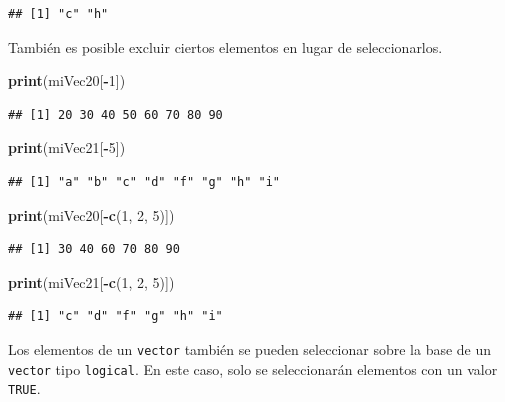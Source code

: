 \documentclass[]{book}
\newenvironment{Shaded}{\begin{snugshade}}{\end{snugshade}}
\newcommand{\KeywordTok}[1]{\textcolor[rgb]{0.13,0.29,0.53}{\textbf{#1}}}
\newcommand{\DecValTok}[1]{\textcolor[rgb]{0.00,0.00,0.81}{#1}}
\newcommand{\OperatorTok}[1]{\textcolor[rgb]{0.81,0.36,0.00}{\textbf{#1}}}
\newcommand{\NormalTok}[1]{#1}
\begin{document}
\begin{verbatim}
## [1] "c" "h"
\end{verbatim}

También es posible excluir ciertos elementos en lugar de seleccionarlos.

\begin{Shaded}
\begin{Highlighting}[]
\KeywordTok{print}\NormalTok{(miVec20[}\OperatorTok{-}\DecValTok{1}\NormalTok{])}
\end{Highlighting}
\end{Shaded}

\begin{verbatim}
## [1] 20 30 40 50 60 70 80 90
\end{verbatim}

\begin{Shaded}
\begin{Highlighting}[]
\KeywordTok{print}\NormalTok{(miVec21[}\OperatorTok{-}\DecValTok{5}\NormalTok{])}
\end{Highlighting}
\end{Shaded}

\begin{verbatim}
## [1] "a" "b" "c" "d" "f" "g" "h" "i"
\end{verbatim}

\begin{Shaded}
\begin{Highlighting}[]
\KeywordTok{print}\NormalTok{(miVec20[}\OperatorTok{-}\KeywordTok{c}\NormalTok{(}\DecValTok{1}\NormalTok{, }\DecValTok{2}\NormalTok{, }\DecValTok{5}\NormalTok{)])}
\end{Highlighting}
\end{Shaded}

\begin{verbatim}
## [1] 30 40 60 70 80 90
\end{verbatim}

\begin{Shaded}
\begin{Highlighting}[]
\KeywordTok{print}\NormalTok{(miVec21[}\OperatorTok{-}\KeywordTok{c}\NormalTok{(}\DecValTok{1}\NormalTok{, }\DecValTok{2}\NormalTok{, }\DecValTok{5}\NormalTok{)])}
\end{Highlighting}
\end{Shaded}

\begin{verbatim}
## [1] "c" "d" "f" "g" "h" "i"
\end{verbatim}

Los elementos de un \texttt{vector} también se pueden seleccionar sobre
la base de un \texttt{vector} tipo \texttt{logical}. En este caso, solo
se seleccionarán elementos con un valor \texttt{TRUE}.
\end{document}
